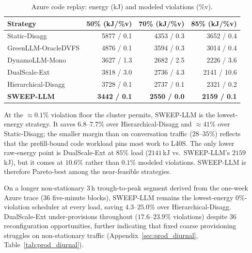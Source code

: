 \begin{table}[t]
\centering
\caption{Azure code replay: energy (kJ) and modeled violations (\%v).}
\label{tab:prod_code}
\small
\setlength{\tabcolsep}{5pt}
\begin{tabular}{@{}lrrr@{}}
\toprule
Strategy & 50\% (kJ/\%v) & 70\% (kJ/\%v) & 85\% (kJ/\%v) \\
\midrule
Static-Disagg        & 5877 / 0.1 & 4353 / 0.3 & 3652 / 0.4 \\
GreenLLM-OracleDVFS  & 4876 / 0.1 & 3594 / 0.3 & 3014 / 0.4 \\
DynamoLLM-Mono       & 3627 / 1.3 & 2682 / 2.5 & 2226 / 3.6 \\
DualScale-Ext        & 3818 / 3.0 & 2736 / 4.3 & 2141 / 10.6 \\
Hierarchical-Disagg  & 3728 / 0.1 & 2737 / 0.1 & 2321 / 0.2 \\
\textbf{SWEEP-LLM}   & \textbf{3442 / 0.1} & \textbf{2550 / 0.0} & \textbf{2159 / 0.1} \\
\bottomrule
\end{tabular}
\end{table}

At the $\approx$$0.1\%$ violation floor the cluster permits, SWEEP-LLM is the lowest-energy strategy.
It saves $6.8$--$7.7\%$ over Hierarchical-Disagg and $\approx$$41\%$ over Static-Disagg; the smaller margin than on conversation traffic ($28$--$35\%$) reflects that the prefill-bound code workload pins most work to L40S.
The only lower raw-energy point is DualScale-Ext at $85\%$ load ($2141$\,kJ vs.\ SWEEP-LLM's $2159$\,kJ), but it comes at $10.6\%$ rather than $0.1\%$ modeled violations.
SWEEP-LLM is therefore Pareto-best among the near-feasible strategies.

On a longer non-stationary $3$\,h trough-to-peak segment derived from the one-week Azure trace ($36$ five-minute blocks), SWEEP-LLM remains the lowest-energy $0\%$-violation scheduler at every load, saving $4.3$--$25.0\%$ over Hierarchical-Disagg.
DualScale-Ext under-provisions throughout ($17.6$--$23.9\%$ violations) despite $36$ reconfiguration opportunities, further indicating that fixed coarse provisioning struggles on non-stationary traffic (Appendix~\ref{sec:prod_diurnal}, Table~\ref{tab:prod_diurnal}).

\iffalse  %


